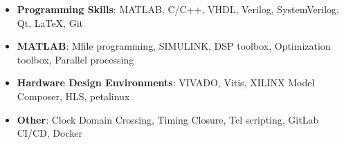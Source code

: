 
\begin{itemize}
	\item \textbf{Programming Skills}:
	      MATLAB, C/C++, VHDL, Verilog, SystemVerilog, Qt, \LaTeX, Git
	\item \textbf{MATLAB}:
	      Mfile programming, SIMULINK, DSP toolbox, Optimization toolbox, Parallel processing
	\item \textbf{Hardware Design Environments}:
	      VIVADO, Vitis, XILINX Model Composer, HLS, petalinux
	\item \textbf{Other}:
	      Clock Domain Crossing, Timing Closure, Tcl scripting, GitLab CI/CD, Docker
\end{itemize}